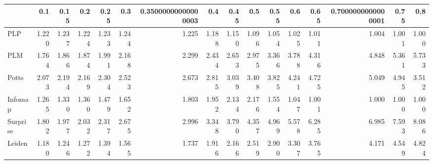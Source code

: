\begin{tabular}{lrrrrrrrrrrrrrrr}
\toprule
{} &   0.1 &  0.15 &   0.2 &  0.25 &   0.3 & 0.35000000000000003 &   0.4 &  0.45 &   0.5 &  0.55 &   0.6 &  0.65 & 0.7000000000000001 &  0.75 &   0.8 \\
\midrule
PLP      & 1.220 & 1.237 & 1.224 & 1.233 & 1.244 &               1.225 & 1.188 & 1.150 & 1.096 & 1.054 & 1.025 & 1.011 &              1.004 & 1.001 & 1.000 \\
PLM      & 1.764 & 1.866 & 1.874 & 1.991 & 2.168 &               2.299 & 2.434 & 2.653 & 2.975 & 3.366 & 3.788 & 4.316 &              4.848 & 5.361 & 5.733 \\
Potts    & 2.073 & 2.194 & 2.169 & 2.304 & 2.523 &               2.673 & 2.815 & 3.039 & 3.408 & 3.825 & 4.241 & 4.725 &              5.049 & 4.945 & 3.512 \\
Infomap  & 1.265 & 1.330 & 1.360 & 1.479 & 1.652 &               1.803 & 1.952 & 2.134 & 2.176 & 1.554 & 1.047 & 1.001 &              1.000 & 1.000 & 1.000 \\
Surprise & 1.802 & 1.977 & 2.032 & 2.317 & 2.675 &               2.996 & 3.348 & 3.790 & 4.357 & 4.969 & 5.578 & 6.285 &              6.985 & 7.593 & 8.086 \\
Leiden   & 1.180 & 1.246 & 1.272 & 1.394 & 1.565 &               1.737 & 1.916 & 2.166 & 2.519 & 2.900 & 3.307 & 3.765 &              4.171 & 4.549 & 4.824 \\
\bottomrule
\end{tabular}
